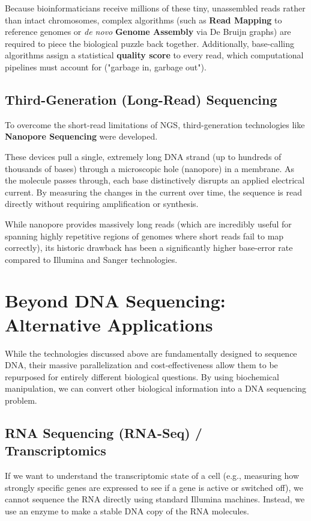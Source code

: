 Because bioinformaticians receive millions of these tiny, unassembled reads rather than intact chromosomes, complex algorithms (such as \textbf{Read Mapping} to reference genomes or \textit{de novo} \textbf{Genome Assembly} via De Bruijn graphs) are required to piece the biological puzzle back together. Additionally, base-calling algorithms assign a statistical \textbf{quality score} to every read, which computational pipelines must account for ("garbage in, garbage out").

\subsection{Third-Generation (Long-Read) Sequencing}
To overcome the short-read limitations of NGS, third-generation technologies like \textbf{Nanopore Sequencing} were developed. 

These devices pull a single, extremely long DNA strand (up to hundreds of thousands of bases) through a microscopic hole (nanopore) in a membrane. As the molecule passes through, each base distinctively disrupts an applied electrical current. By measuring the changes in the current over time, the sequence is read directly without requiring amplification or synthesis.

While nanopore provides massively long reads (which are incredibly useful for spanning highly repetitive regions of genomes where short reads fail to map correctly), its historic drawback has been a significantly higher base-error rate compared to Illumina and Sanger technologies.

\section{Beyond DNA Sequencing: Alternative Applications}

While the technologies discussed above are fundamentally designed to sequence DNA, their massive parallelization and cost-effectiveness allow them to be repurposed for entirely different biological questions. By using biochemical manipulation, we can convert other biological information into a DNA sequencing problem.

\subsection{RNA Sequencing (RNA-Seq) / Transcriptomics}
If we want to understand the transcriptomic state of a cell (e.g., measuring how strongly specific genes are expressed to see if a gene is active or switched off), we cannot sequence the RNA directly using standard Illumina machines. 
Instead, we use an enzyme to make a stable DNA copy of the RNA molecules.

